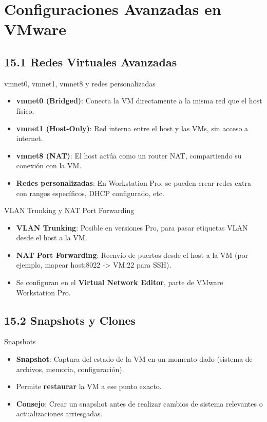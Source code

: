 \documentclass{beamer}
\begin{document}
\section{Configuraciones Avanzadas en VMware}

\subsection{15.1 Redes Virtuales Avanzadas}
\begin{frame}{vmnet0, vmnet1, vmnet8 y redes personalizadas}
    \begin{itemize}
        \item \textbf{vmnet0 (Bridged)}: Conecta la VM directamente a la misma red que el host físico.
        \item \textbf{vmnet1 (Host-Only)}: Red interna entre el host y las VMs, sin acceso a internet.
        \item \textbf{vmnet8 (NAT)}: El host actúa como un router NAT, compartiendo su conexión con la VM.
        \item \textbf{Redes personalizadas}: En Workstation Pro, se pueden crear redes extra con rangos específicos, DHCP configurado, etc.
    \end{itemize}
\end{frame}

\begin{frame}{VLAN Trunking y NAT Port Forwarding}
    \begin{itemize}
        \item \textbf{VLAN Trunking}: Posible en versiones Pro, para pasar etiquetas VLAN desde el host a la VM.
        \item \textbf{NAT Port Forwarding}: Reenvío de puertos desde el host a la VM (por ejemplo, mapear host:8022 -> VM:22 para SSH).
        \item Se configuran en el \textbf{Virtual Network Editor}, parte de VMware Workstation Pro.
    \end{itemize}
\end{frame}

\subsection{15.2 Snapshots y Clones}
\begin{frame}{Snapshots}
    \begin{itemize}
        \item \textbf{Snapshot}: Captura del estado de la VM en un momento dado (sistema de archivos, memoria, configuración).
        \item Permite \textbf{restaurar} la VM a ese punto exacto.
        \item \textbf{Consejo}: Crear un snapshot antes de realizar cambios de sistema relevantes o actualizaciones arriesgadas.
    \end{itemize}
\end{frame}
\end{document}

